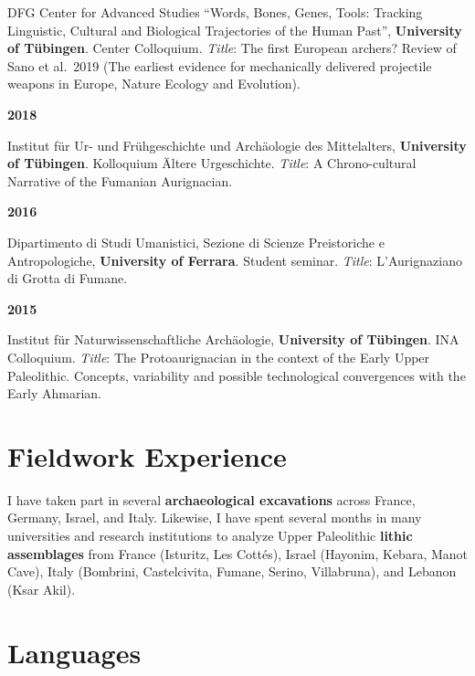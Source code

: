 \documentclass[11pt,a4paper,]{awesome-cv}
\begin{document}
DFG Center for Advanced Studies ``Words, Bones, Genes, Tools: Tracking
Linguistic, Cultural and Biological Trajectories of the Human Past'',
\textbf{University of Tübingen}. Center Colloquium. \emph{Title}: The
first European archers? Review of Sano et al.~2019 (The earliest
evidence for mechanically delivered projectile weapons in Europe, Nature
Ecology and Evolution).

\setlength{\leftskip}{0cm}

\textbf{2018}

\setlength{\leftskip}{1cm}

Institut für Ur- und Frühgeschichte und Archäologie des Mittelalters,
\textbf{University of Tübingen}. Kolloquium Ältere Urgeschichte.
\emph{Title}: A Chrono-cultural Narrative of the Fumanian Aurignacian.

\setlength{\leftskip}{0cm}

\textbf{2016}

\setlength{\leftskip}{1cm}

Dipartimento di Studi Umanistici, Sezione di Scienze Preistoriche e
Antropologiche, \textbf{University of Ferrara}. Student seminar.
\emph{Title}: L'Aurignaziano di Grotta di Fumane.

\newpage
\setlength{\leftskip}{0cm}

\textbf{2015}

\setlength{\leftskip}{1cm}

Institut für Naturwissenschaftliche Archäologie, \textbf{University of
Tübingen}. INA Colloquium. \emph{Title}: The Protoaurignacian in the
context of the Early Upper Paleolithic. Concepts, variability and
possible technological convergences with the Early Ahmarian.

\setlength{\leftskip}{0cm}

\hypertarget{fieldwork-experience}{%
\section{Fieldwork Experience}\label{fieldwork-experience}}

I have taken part in several \textbf{archaeological excavations} across
France, Germany, Israel, and Italy. Likewise, I have spent several
months in many universities and research institutions to analyze Upper
Paleolithic \textbf{lithic assemblages} from France (Isturitz, Les
Cottés), Israel (Hayonim, Kebara, Manot Cave), Italy (Bombrini,
Castelcivita, Fumane, Serino, Villabruna), and Lebanon (Ksar Akil).

\hypertarget{languages}{%
\section{Languages}\label{languages}}
\end{document}
